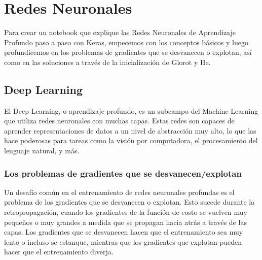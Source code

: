 \documentclass[11pt]{article}
\date{}
\title{}
\begin{document}
\setcounter{tocdepth}{3}
\tableofcontents

\setlength\parindent{10pt}

\section{Redes Neuronales}
\label{sec:org36c8052}
Para crear un notebook que explique las Redes Neuronales de Aprendizaje
Profundo paso a paso con Keras, empecemos con los conceptos básicos y
luego profundicemos en los problemas de gradientes que se desvanecen o
explotan, así como en las soluciones a través de la inicialización de
Glorot y He.

\subsection{Deep Learning}
\label{sec:org247a5f7}
El Deep Learning, o aprendizaje profundo, es un subcampo del Machine
Learning que utiliza redes neuronales con muchas capas. Estas redes son
capaces de aprender representaciones de datos a un nivel de abstracción
muy alto, lo que las hace poderosas para tareas como la visión por
computadora, el procesamiento del lenguaje natural, y más.

\subsubsection{Los problemas de gradientes que se desvanecen/explotan}
\label{sec:orga8f0e7f}
Un desafío común en el entrenamiento de redes neuronales profundas es el
problema de los gradientes que se desvanecen o explotan. Esto sucede
durante la retropropagación, cuando los gradientes de la función de
costo se vuelven muy pequeños o muy grandes a medida que se propagan
hacia atrás a través de las capas. Los gradientes que se desvanecen
hacen que el entrenamiento sea muy lento o incluso se estanque, mientras
que los gradientes que explotan pueden hacer que el entrenamiento
diverja.
\end{document}
